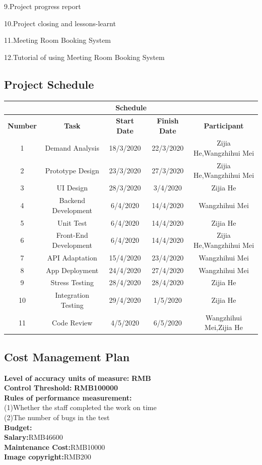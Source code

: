 \documentclass[runningheads]{llncs}
\begin{document}
9.Project progress report

10.Project closing and lessons-learnt

11.Meeting Room Booking System

12.Tutorial of using Meeting Room Booking System

\subsection{Project Schedule}
\begin{table}
\centering
\begin{tabular}{|c|c|c|c|c|}
\hline
\multicolumn{5}{|c|}{\textbf{Schedule}}\\ %
\hline
\textbf{Number}&\textbf{Task}&\textbf{Start Date}&\textbf{Finish Date}&\textbf{Participant}\\
\hline
1&Demand Analysis&18/3/2020&22/3/2020&Zijia He,Wangzhihui Mei\\
\hline
2&Prototype Design&23/3/2020&27/3/2020&Zijia He,Wangzhihui Mei\\
\hline
3&UI Design&28/3/2020&3/4/2020&Zijia He\\
\hline
4&Backend Development&6/4/2020&14/4/2020&Wangzhihui Mei\\
\hline
5&Unit Test&6/4/2020&14/4/2020&Zijia He\\
\hline
6&Front-End Development&6/4/2020&14/4/2020&Zijia He,Wangzhihui Mei\\
\hline
7&API Adaptation&15/4/2020&23/4/2020&Wangzhihui Mei\\
\hline
8&App Deployment&24/4/2020&27/4/2020&Wangzhihui Mei\\
\hline
9&Stress Testing&28/4/2020&28/4/2020&Zijia He\\
\hline
10&Integration Testing&29/4/2020&1/5/2020&Zijia He\\
\hline
11&Code Review&4/5/2020&6/5/2020&Wangzhihui Mei,Zijia He\\
\hline
\end{tabular}
\end{table}

\subsection{Cost Management Plan}
\textbf{Level of accuracy units of measure:} \textbf{RMB}\\
\textbf{Control Threshold:} \textbf{RMB100000}\\
\textbf{Rules of performance measurement:}\\
(1)Whether the staff completed the work on time\\
(2)The number of bugs in the test\\
\textbf{Budget:}\\
\textbf{Salary:}RMB46600\\
\textbf{Maintenance Cost:}RMB10000\\
\textbf{Image copyright:}RMB200
\end{document}
